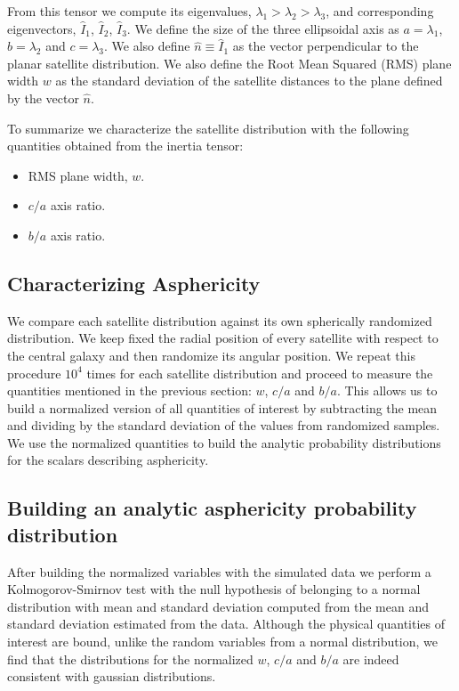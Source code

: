 \documentclass[a4paper,fleqn,usenatbib]{mnras}
\begin{document}
From this tensor we compute its eigenvalues,
$\lambda_1>\lambda_2>\lambda_3$, and corresponding eigenvectors,
$\hat{I}_1$, $\hat{I}_2$, $\hat{I}_3$.
We define the size of the three ellipsoidal axis as
$a=\lambda_1$, $b=\lambda_2$ and $c=\lambda_3$.
We also define $\hat{n}\equiv \hat{I}_1$ as the vector perpendicular to the
planar satellite distribution. 
We also define the Root Mean Squared (RMS) plane width $w$ as the
standard deviation of the satellite distances to the plane defined by
the vector $\hat{n}$.    

To summarize we characterize the satellite distribution with the following
quantities obtained from the inertia tensor: 
\begin{itemize}
\item RMS plane width, $w$.
\item $c/a$ axis ratio.
\item $b/a$ axis ratio.
\end{itemize}



\subsection{Characterizing Asphericity}

We compare each satellite distribution against its own spherically
randomized distribution.
We keep fixed the radial position of every satellite
with respect to the central galaxy and then randomize its angular
position. 
We repeat this procedure $10^4$ times for each satellite distribution
and proceed to measure the quantities mentioned in the previous section:
$w$, $c/a$ and $b/a$.
This allows us to build a normalized version of all quantities of
interest by subtracting the mean and dividing by the standard
deviation of the values from randomized samples.
We use the normalized quantities to build the analytic probability
distributions for the scalars describing asphericity. 


\subsection{Building an analytic asphericity probability distribution}

After building the normalized variables with the simulated data we
perform a Kolmogorov-Smirnov test with the null hypothesis of belonging
to a normal distribution with mean and standard deviation computed
from the mean and standard deviation estimated from the data.
Although the physical quantities of interest are bound, unlike the
random variables from a normal distribution, we find that the
distributions for the normalized $w$, $c/a$ and $b/a$ are indeed
consistent with gaussian distributions. 
\end{document}
